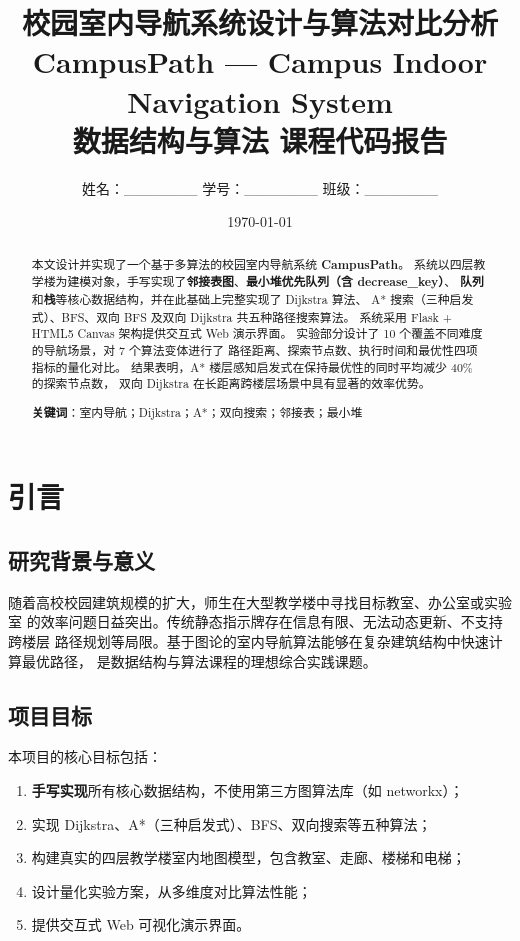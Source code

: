 \documentclass[11pt,a4paper]{ctexart}
\title{
    {\Huge 校园室内导航系统设计与算法对比分析} \\[8pt]
    {\large CampusPath — Campus Indoor Navigation System} \\[8pt]
    {\normalsize 数据结构与算法 课程代码报告}
}
\author{
    姓名：\_\_\_\_\_\_\_ \quad
    学号：\_\_\_\_\_\_\_ \quad
    班级：\_\_\_\_\_\_\_
}
\date{\today}
\begin{document}
\maketitle

\begin{abstract}
\noindent
本文设计并实现了一个基于多算法的校园室内导航系统 \textbf{CampusPath}。
系统以四层教学楼为建模对象，手写实现了\textbf{邻接表图}、\textbf{最小堆优先队列（含 decrease\_key）}、
\textbf{队列}和\textbf{栈}等核心数据结构，并在此基础上完整实现了 Dijkstra 算法、
A* 搜索（三种启发式）、BFS、双向 BFS 及双向 Dijkstra 共五种路径搜索算法。
系统采用 Flask + HTML5 Canvas 架构提供交互式 Web 演示界面。
实验部分设计了 10 个覆盖不同难度的导航场景，对 7 个算法变体进行了
路径距离、探索节点数、执行时间和最优性四项指标的量化对比。
结果表明，A* 楼层感知启发式在保持最优性的同时平均减少 40\% 的探索节点数，
双向 Dijkstra 在长距离跨楼层场景中具有显著的效率优势。

\noindent\textbf{关键词}：室内导航；Dijkstra；A*；双向搜索；邻接表；最小堆
\end{abstract}

\tableofcontents
\newpage

\section{引言}

\subsection{研究背景与意义}

随着高校校园建筑规模的扩大，师生在大型教学楼中寻找目标教室、办公室或实验室
的效率问题日益突出。传统静态指示牌存在信息有限、无法动态更新、不支持跨楼层
路径规划等局限。基于图论的室内导航算法能够在复杂建筑结构中快速计算最优路径，
是数据结构与算法课程的理想综合实践课题。

\subsection{项目目标}

本项目的核心目标包括：

\begin{enumerate}
    \item \textbf{手写实现}所有核心数据结构，不使用第三方图算法库（如 networkx）；
    \item 实现 Dijkstra、A*（三种启发式）、BFS、双向搜索等五种算法；
    \item 构建真实的四层教学楼室内地图模型，包含教室、走廊、楼梯和电梯；
    \item 设计量化实验方案，从多维度对比算法性能；
    \item 提供交互式 Web 可视化演示界面。
\end{enumerate}
\end{document}
